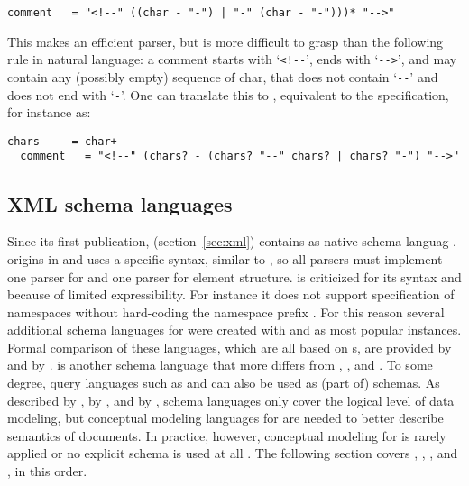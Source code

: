 \begin{lstlisting}[language=BNF]
  comment   = "<!--" ((char - "-") | "-" (char - "-")))* "-->"
\end{lstlisting}

\noindent This makes an efficient parser, but is more difficult to grasp than
the following rule in natural language: a {\sf comment} starts with
`\verb|<!--|', ends with `\verb|-->|', and may contain any (possibly empty)
sequence of {\sf char}, that does not contain `\verb|--|' and does not end with
`\verb|-|'. One can translate this to , equivalent to the specification, 
for instance as:

\begin{lstlisting}[language=BNF]
  chars     = char+
  comment   = "<!--" (chars? - (chars? "--" chars? | chars? "-") "-->"
\end{lstlisting}


\subsection{XML schema languages}
\label{sec:xmlschemas}

Since its first publication,  (section~\ref{sec:xml}) contains
 as native schema languag \cite{Bray1998}.
 origins in  and uses a specific syntax, similar to
, so all  parsers must implement one parser
for  and one parser for  element structure.   is
criticized for its syntax and because of limited expressibility.  For instance
it does not support specification of  namespaces without hard-coding
the namespace prefix \cite{Bray2009}. For this reason several additional schema
languages for  were created with  and  as most popular instances. Formal comparison of these languages, which are
all based on s, are provided by \textcite{Murata2005} and
by \textcite{Stuehrenberg2010}.  is another schema language
that more differs from , , and .  To some
degree, query languages such as  and  can also be
used as (part of)  schemas. As described by
\textcite{Necasky2006,Necasky2008}, by \textcite{Sengupta2006}, and by
\textcite{Chen2010},  schema languages only cover the logical level
of data modeling, but conceptual modeling languages for  are needed
to better describe semantics of  documents. In practice, however,
conceptual modeling for  is rarely applied \cite{Mohan2009} or no
explicit schema is used at all \cite{Wilde2008}. The following section covers
, , , and , in this
order.

